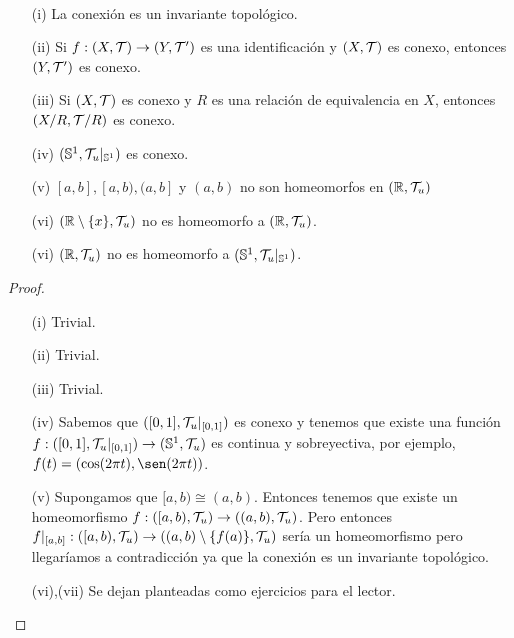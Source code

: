 \begin{coro}\
    \begin{enumerate}
        \item[(i)] La conexión es un invariante topológico.
        \item[(ii)] Si $f:(X, \mathcal{T})\to (Y, \mathcal{T}')$ es una identificación y $(X, \mathcal{T})$ es conexo, entonces $(Y, \mathcal{T}')$ es conexo.
        \item[(iii)] Si $(X, \mathcal{T})$ es conexo y $R$ es una relación de equivalencia en $X$, entonces $(X/R, \mathcal{T}/R)$ es conexo.
        \item[(iv)] $(\mathbb{S}^1, \mathcal{T}_u|_{\mathbb{S}^1})$ es conexo.
        \item[(v)] $[a,b], [a,b), (a,b]$ y $(a,b)$ no son homeomorfos en $(\mathbb{R}, \mathcal{T}_u)$ 
        \item[(vi)] $(\mathbb{R}\setminus \{x\}, \mathcal{T}_u)$ no es homeomorfo a $(\mathbb{R}, \mathcal{T}_u)$.
        \item[(vi)] $(\mathbb{R}, \mathcal{T}_u)$ no es homeomorfo a $(\mathbb{S}^1, \mathcal{T}_u|_{\mathbb{S}^1})$.  
    \end{enumerate}
    \begin{proof}\
        \begin{enumerate}
            \item[(i)] Trivial.
            \item[(ii)] Trivial.
            \item[(iii)] Trivial.
            \item[(iv)] Sabemos que $([0,1], \mathcal{T}_u|_{[0,1]})$ es conexo y tenemos que existe una función $f:([0,1], \mathcal{T}_u|_{[0,1]})\to (\mathbb{S}^1, \mathcal{T}_u)$ es continua y sobreyectiva, por ejemplo, $f(t)=(\cos(2\pi t), \sen(2\pi t))$.
            \item[(v)] Supongamos que $[a,b)\cong(a,b)$. Entonces tenemos que existe un homeomorfismo $f:([a,b), \mathcal{T}_u)\to ((a,b), \mathcal{T}_u)$. Pero entonces $f|_{[a,b]}:([a,b), \mathcal{T}_u)\to ((a,b)\setminus \{f(a)\}, \mathcal{T}_u)$ sería un homeomorfismo pero llegaríamos a contradicción ya que la conexión es un invariante topológico.
            \item[(vi),(vii)] Se dejan planteadas como ejercicios para el lector.  
        \end{enumerate}
    \end{proof}
\end{coro}

